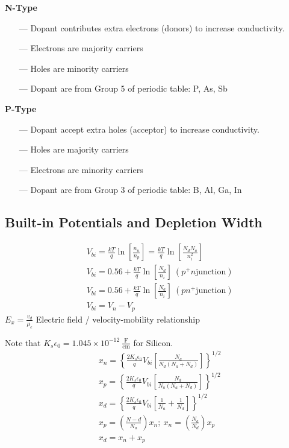 \begin{multicols}{3}
\begin{minipage}[h]{0.5\linewidth}
\textbf{N-Type}
\begin{enumerate}
\item[---] Dopant contributes extra electrons (donors) to increase conductivity.
\item[---] Electrons are majority carriers
\item[---] Holes are minority carriers
\item[---] Dopant are from Group 5 of periodic table: P, As, Sb
\end{enumerate}
\end{minipage}
\begin{minipage}[h]{0.5\linewidth}
\textbf{P-Type}
\begin{enumerate}
\item[---] Dopant accept extra holes (acceptor) to increase conductivity.
\item[---] Holes are majority carriers
\item[---] Electrons are minority carriers
\item[---] Dopant are from Group 3 of periodic table: B, Al, Ga, In
\end{enumerate}
\end{minipage}
\subsection{Built-in Potentials and Depletion Width}
\begin{align*}
& V_{bi}=\frac{kT}{q} \ln \left[\frac{n_n}{n_p}\right]=\frac{kT}{q} \ln \left[ \frac{N_d N_a}{n_i^2}\right] \\
& V_{bi} = 0.56 + \frac{kT}{q} \ln \left[\frac{N_d}{n_i}\right] \ (p^+n \text{junction}) \\
& V_{bi} = 0.56 + \frac{kT}{q} \ln \left[\frac{N_a}{n_i}\right] \ (pn^+ \text{junction}) \\
& V_{bi}=V_n-V_p
\end{align*}
$\displaystyle E_x = \frac{v_d}{\mu_e}$ Electric field / velocity-mobility relationship

\hfill Note that $K_s \epsilon_0=1.045 \times 10^{-12} \ \frac{\text{F}}{\text{cm}}$ for Silicon.
\begin{align*}
& x_n=\left\{ \frac{2K_s \epsilon_0}{q} V_{bi} \left[\frac{N_a}{N_d(N_a+N_d)}\right] \right\}^{1/2} \\
& x_p=\left\{ \frac{2K_s \epsilon_0}{q} V_{bi} \left[\frac{N_d}{N_a(N_a+N_d)}\right] \right\}^{1/2} \\
& x_d = \left\{ \frac{2K_s \epsilon_0}{q} V_{bi} \left[\frac{1}{N_a}+\frac{1}{N_d}\right] \right\}^{1/2} \\
& x_p=\left(\frac{N-d}{N_a}\right)x_n; \ x_n = \left(\frac{N_a}{N_d}\right)x_p \\
& x_d = x_n + x_p
\end{align*}


\end{multicols}
